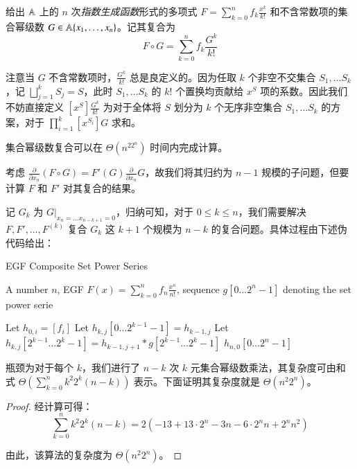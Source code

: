 \begin{definition} [集合幂级数复合]
给出 $\mathbb A$ 上的 $n$ 次\emph{指数生成函数}形式的多项式 $F = \sum_{k=0}^n f_k \frac{x^k}{k!}$ 和不含常数项的集合幂级数 $G \in \mathbb A\{x_1, \dots, x_n\}$。记其复合为
$$
F\circ G = \sum_{k=0}^n f_k\frac{G^k}{k!}
$$

注意当 $G$ 不含常数项时，$\frac{G^k}{k!}$ 总是良定义的。因为任取 $k$ 个非空不交集合 $S_1,\dots S_k$，记 $\bigsqcup_{j=1}^k S_j = S$，此时 $S_1,\dots S_k$ 的 $k!$ 个置换均贡献给 $x^S$ 项的系数。因此我们不妨直接定义 $[x^S]\frac{G^k}{k!}$ 为对于全体将 $S$ 划分为 $k$ 个无序非空集合 $S_1,\dots S_k$ 的方案，对于 $\prod_{i=1}^k [x^{S_i}]G$ 求和。
\end{definition}

\begin{theorem} \label{setcomp}
集合幂级数复合可以在 $\Theta(n^22^n)$ 时间内完成计算。
\end{theorem}

考虑 $\frac{\partial}{\partial x_n} (F \circ G) = F'(G)\frac{\partial}{\partial x_n} G$，故我们将其归约为 $n-1$ 规模的子问题，但要计算 $F$ 和 $F'$ 对其复合的结果。

记 $G_k$ 为 $\left. G \right |_{x_n = \dots x_{n-k+1}=0}$，归纳可知，对于 $0\le k\le n$，我们需要解决 $F, F', \dots, F^{(k)}$ 复合 $G_k$ 这 $k+1$ 个规模为 $n-k$ 的复合问题。具体过程由下述伪代码给出：

\begin{breakablealgorithm}
  \caption{EGF Composite Set Power Series}
  \begin{algorithmic}[1]
    \REQUIRE A number $n$, EGF $F(x)=\sum_{k=0}^n f_n \frac{x^n}{n!}$, sequence $g[0\dots 2^n-1]$ denoting the set power serie

      \STATE Let $h_{0,i} = [f_i]$
    \ENDFOR
        \STATE Let $h_{k,j}[0\dots 2^{k-1}-1] = h_{k-1,j}$
        \STATE Let $h_{k,j}[2^{k-1}\dots 2^k-1] = h_{k-1,j+1} * g[2^{k-1}\dots 2^k-1]$
      \ENDFOR
    \ENDFOR
    \RETURN $h_{n,0}[0\dots 2^n-1]$
  \end{algorithmic}
\end{breakablealgorithm}

瓶颈为对于每个 $k$，我们进行了 $n-k$ 次 $k$ 元集合幂级数乘法，其复杂度可由和式 $\Theta \left(\sum_{k=0}^n k^2 2^k (n-k)\right)$ 表示。下面证明其复杂度就是 $\Theta(n^2 2^n)$。

\begin{proof}
经计算可得：
$$
\sum_{k=0}^n k^2 2^k (n-k) = 2(-13 + 13\cdot 2^n - 3n - 6\cdot 2^n n+ 2^n n^2)
$$

由此，该算法的复杂度为 $\Theta(n^2 2^n)$。
\end{proof}

